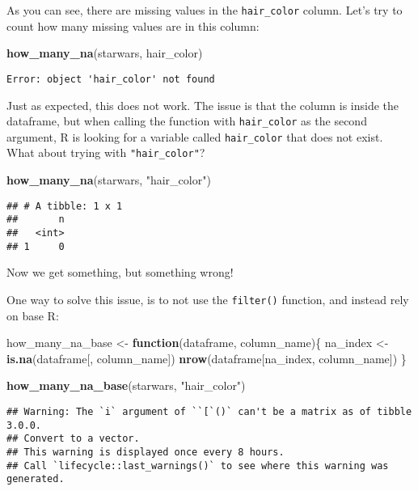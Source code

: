 \documentclass[
]{article}
\newenvironment{Shaded}{\begin{snugshade}}{\end{snugshade}}
\newcommand{\ControlFlowTok}[1]{\textcolor[rgb]{0.13,0.29,0.53}{\textbf{#1}}}
\newcommand{\KeywordTok}[1]{\textcolor[rgb]{0.13,0.29,0.53}{\textbf{#1}}}
\newcommand{\NormalTok}[1]{#1}
\newcommand{\StringTok}[1]{\textcolor[rgb]{0.31,0.60,0.02}{#1}}
\begin{document}
As you can see, there are missing values in the \texttt{hair\_color} column. Let's try to count how many
missing values are in this column:

\begin{Shaded}
\begin{Highlighting}[]
\KeywordTok{how\_many\_na}\NormalTok{(starwars, hair\_color)}
\end{Highlighting}
\end{Shaded}

\begin{verbatim}
Error: object 'hair_color' not found
\end{verbatim}

Just as expected, this does not work. The issue is that the column is inside the dataframe,
but when calling the function with \texttt{hair\_color} as the second argument, R is looking for a
variable called \texttt{hair\_color} that does not exist. What about trying with \texttt{"hair\_color"}?

\begin{Shaded}
\begin{Highlighting}[]
\KeywordTok{how\_many\_na}\NormalTok{(starwars, }\StringTok{"hair\_color"}\NormalTok{)}
\end{Highlighting}
\end{Shaded}

\begin{verbatim}
## # A tibble: 1 x 1
##       n
##   <int>
## 1     0
\end{verbatim}

Now we get something, but something wrong!

One way to solve this issue, is to not use the \texttt{filter()} function, and instead rely on base R:

\begin{Shaded}
\begin{Highlighting}[]
\NormalTok{how\_many\_na\_base \textless{}{-}}\StringTok{ }\ControlFlowTok{function}\NormalTok{(dataframe, column\_name)\{}
\NormalTok{  na\_index \textless{}{-}}\StringTok{ }\KeywordTok{is.na}\NormalTok{(dataframe[, column\_name])}
  \KeywordTok{nrow}\NormalTok{(dataframe[na\_index, column\_name])}
\NormalTok{\}}

\KeywordTok{how\_many\_na\_base}\NormalTok{(starwars, }\StringTok{"hair\_color"}\NormalTok{)}
\end{Highlighting}
\end{Shaded}

\begin{verbatim}
## Warning: The `i` argument of ``[`()` can't be a matrix as of tibble 3.0.0.
## Convert to a vector.
## This warning is displayed once every 8 hours.
## Call `lifecycle::last_warnings()` to see where this warning was generated.
\end{verbatim}
\end{document}
